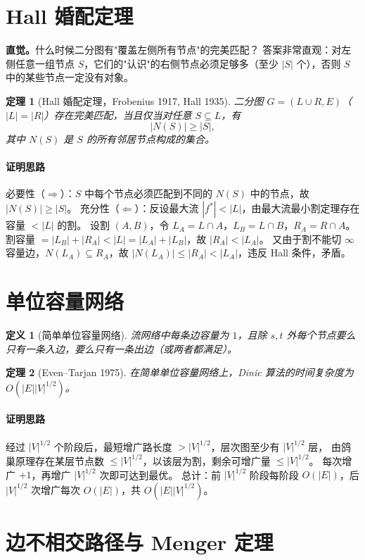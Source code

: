 \documentclass[UTF8,openany,12pt]{ctexbook}
\newtheorem{definition}{定义}[chapter]
\newtheorem{theorem}{定理}[chapter]
\theoremstyle{remark}
\newcommand{\proofidea}[1]{\paragraph{证明思路}#1}
\begin{document}
\section{Hall 婚配定理}

\noindent\textbf{直觉。}什么时候二分图有"覆盖左侧所有节点"的完美匹配？
答案非常直观：对左侧任意一组节点 $S$，它们的"认识"的右侧节点必须足够多（至少 $|S|$ 个），否则 $S$ 中的某些节点一定没有对象。

\begin{theorem}[Hall 婚配定理，Frobenius 1917, Hall 1935]
二分图 $G=(L\cup R,E)$（$|L|=|R|$）存在完美匹配，当且仅当对任意 $S\subseteq L$，有
\[
  |N(S)|\ge|S|,
\]
其中 $N(S)$ 是 $S$ 的所有邻居节点构成的集合。
\end{theorem}
\proofidea{
必要性（$\Rightarrow$）：$S$ 中每个节点必须匹配到不同的 $N(S)$ 中的节点，故 $|N(S)|\ge|S|$。
充分性（$\Leftarrow$）：反设最大流 $|f^*|<|L|$，由最大流最小割定理存在容量 $<|L|$ 的割。
设割 $(A,B)$，令 $L_A=L\cap A$，$L_B=L\cap B$，$R_A=R\cap A$。
割容量 $=|L_B|+|R_A|<|L|=|L_A|+|L_B|$，故 $|R_A|<|L_A|$。
又由于割不能切 $\infty$ 容量边，$N(L_A)\subseteq R_A$，故 $|N(L_A)|\le|R_A|<|L_A|$，违反 Hall 条件，矛盾。
}

\section{单位容量网络}

\begin{definition}[简单单位容量网络]
流网络中每条边容量为 $1$，且除 $s,t$ 外每个节点要么只有一条入边，要么只有一条出边（或两者都满足）。
\end{definition}

\begin{theorem}[Even--Tarjan 1975]
在简单单位容量网络上，Dinic 算法的时间复杂度为 $O(|E||V|^{1/2})$。
\end{theorem}
\proofidea{
经过 $|V|^{1/2}$ 个阶段后，最短增广路长度 $>|V|^{1/2}$，层次图至少有 $|V|^{1/2}$ 层，
由鸽巢原理存在某层节点数 $\le|V|^{1/2}$，以该层为割，剩余可增广量 $\le|V|^{1/2}$。
每次增广 $+1$，再增广 $|V|^{1/2}$ 次即可达到最优。
总计：前 $|V|^{1/2}$ 阶段每阶段 $O(|E|)$，后 $|V|^{1/2}$ 次增广每次 $O(|E|)$，共 $O(|E||V|^{1/2})$。
}

\section{边不相交路径与 Menger 定理}
\end{document}
